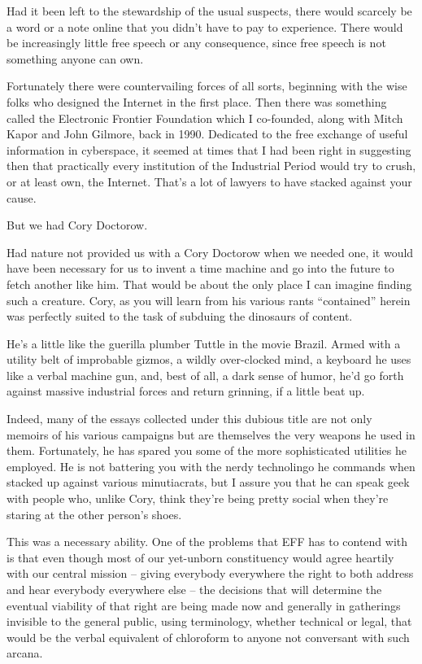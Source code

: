 Had it been left to the stewardship of the usual suspects, there
would scarcely be a word or a note online that you didn't have to
pay to experience. There would be increasingly little free speech
or any consequence, since free speech is not something anyone can
own.

Fortunately there were countervailing forces of all sorts,
beginning with the wise folks who designed the Internet in the
first place. Then there was something called the Electronic
Frontier Foundation which I co-founded, along with Mitch Kapor and
John Gilmore, back in 1990. Dedicated to the free exchange of
useful information in cyberspace, it seemed at times that I had
been right in suggesting then that practically every institution of
the Industrial Period would try to crush, or at least own, the
Internet. That's a lot of lawyers to have stacked against your
cause.

But we had Cory Doctorow.

Had nature not provided us with a Cory Doctorow when we needed one,
it would have been necessary for us to invent a time machine and go
into the future to fetch another like him. That would be about the
only place I can imagine finding such a creature. Cory, as you will
learn from his various rants ``contained'' herein was perfectly
suited to the task of subduing the dinosaurs of content.

He's a little like the guerilla plumber Tuttle in the movie Brazil.
Armed with a utility belt of improbable gizmos, a wildly
over-clocked mind, a keyboard he uses like a verbal machine gun,
and, best of all, a dark sense of humor, he'd go forth against
massive industrial forces and return grinning, if a little beat
up.

Indeed, many of the essays collected under this dubious title are
not only memoirs of his various campaigns but are themselves the
very weapons he used in them. Fortunately, he has spared you some
of the more sophisticated utilities he employed. He is not
battering you with the nerdy technolingo he commands when stacked
up against various minutiacrats, but I assure you that he can speak
geek with people who, unlike Cory, think they're being pretty
social when they're staring at the other person's shoes.

This was a necessary ability. One of the problems that EFF has to
contend with is that even though most of our yet-unborn
constituency would agree heartily with our central mission -- giving
everybody everywhere the right to both address and hear everybody
everywhere else -- the decisions that will determine the eventual
viability of that right are being made now and generally in
gatherings invisible to the general public, using terminology,
whether technical or legal, that would be the verbal equivalent of
chloroform to anyone not conversant with such arcana.

